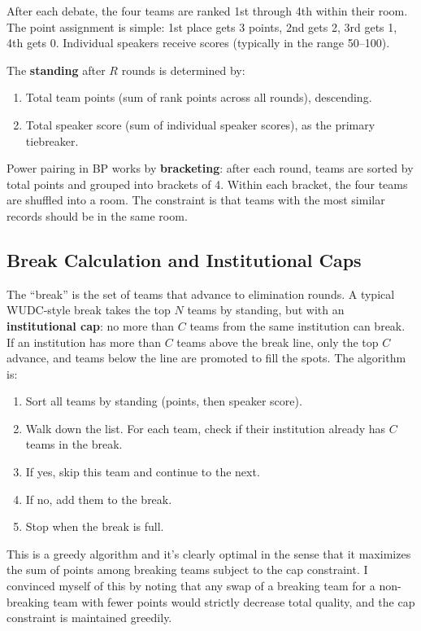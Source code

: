 \documentclass[11pt]{article}
\begin{document}
After each debate, the four teams are ranked 1st through 4th within their room. The point assignment is simple: 1st place gets 3 points, 2nd gets 2, 3rd gets 1, 4th gets 0. Individual speakers receive scores (typically in the range 50--100).

The \textbf{standing} after $R$ rounds is determined by:
\begin{enumerate}
    \item Total team points (sum of rank points across all rounds), descending.
    \item Total speaker score (sum of individual speaker scores), as the primary tiebreaker.
\end{enumerate}

Power pairing in BP works by \textbf{bracketing}: after each round, teams are sorted by total points and grouped into brackets of 4. Within each bracket, the four teams are shuffled into a room. The constraint is that teams with the most similar records should be in the same room.

\subsection{Break Calculation and Institutional Caps}

The ``break'' is the set of teams that advance to elimination rounds. A typical WUDC-style break takes the top $N$ teams by standing, but with an \textbf{institutional cap}: no more than $C$ teams from the same institution can break. If an institution has more than $C$ teams above the break line, only the top $C$ advance, and teams below the line are promoted to fill the spots. The algorithm is:

\begin{enumerate}
    \item Sort all teams by standing (points, then speaker score).
    \item Walk down the list. For each team, check if their institution already has $C$ teams in the break.
    \item If yes, skip this team and continue to the next.
    \item If no, add them to the break.
    \item Stop when the break is full.
\end{enumerate}

This is a greedy algorithm and it's clearly optimal in the sense that it maximizes the sum of points among breaking teams subject to the cap constraint. I convinced myself of this by noting that any swap of a breaking team for a non-breaking team with fewer points would strictly decrease total quality, and the cap constraint is maintained greedily.
\end{document}
